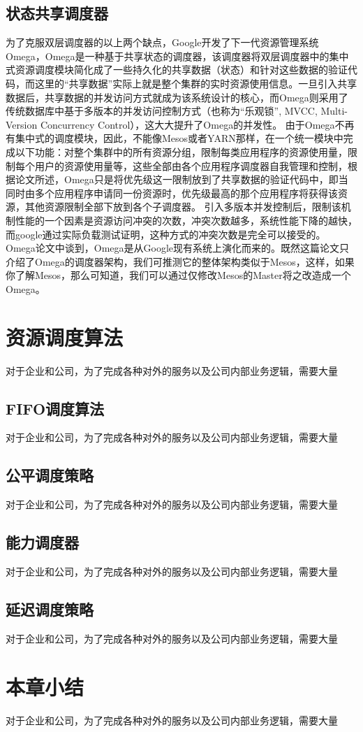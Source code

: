 \subsection{状态共享调度器}
为了克服双层调度器的以上两个缺点，Google开发了下一代资源管理系统Omega，Omega是一种基于共享状态的调度器，该调度器将双层调度器中的集中式资源调度模块简化成了一些持久化的共享数据（状态）和针对这些数据的验证代码，而这里的“共享数据”实际上就是整个集群的实时资源使用信息。一旦引入共享数据后，共享数据的并发访问方式就成为该系统设计的核心，而Omega则采用了传统数据库中基于多版本的并发访问控制方式（也称为“乐观锁”, MVCC, Multi-Version Concurrency Control），这大大提升了Omega的并发性。
由于Omega不再有集中式的调度模块，因此，不能像Mesos或者YARN那样，在一个统一模块中完成以下功能：对整个集群中的所有资源分组，限制每类应用程序的资源使用量，限制每个用户的资源使用量等，这些全部由各个应用程序调度器自我管理和控制，根据论文所述，Omega只是将优先级这一限制放到了共享数据的验证代码中，即当同时由多个应用程序申请同一份资源时，优先级最高的那个应用程序将获得该资源，其他资源限制全部下放到各个子调度器。
引入多版本并发控制后，限制该机制性能的一个因素是资源访问冲突的次数，冲突次数越多，系统性能下降的越快，而google通过实际负载测试证明，这种方式的冲突次数是完全可以接受的。
Omega论文中谈到，Omega是从Google现有系统上演化而来的。既然这篇论文只介绍了Omega的调度器架构，我们可推测它的整体架构类似于Mesos，这样，如果你了解Mesos，那么可知道，我们可以通过仅修改Mesos的Master将之改造成一个Omega。

\section{资源调度算法}

对于企业和公司，为了完成各种对外的服务以及公司内部业务逻辑，需要大量

\subsection{FIFO调度算法}
对于企业和公司，为了完成各种对外的服务以及公司内部业务逻辑，需要大量
\subsection{公平调度策略}
对于企业和公司，为了完成各种对外的服务以及公司内部业务逻辑，需要大量
\subsection{能力调度器}
对于企业和公司，为了完成各种对外的服务以及公司内部业务逻辑，需要大量
\subsection{延迟调度策略}
对于企业和公司，为了完成各种对外的服务以及公司内部业务逻辑，需要大量

\section{本章小结}

对于企业和公司，为了完成各种对外的服务以及公司内部业务逻辑，需要大量

